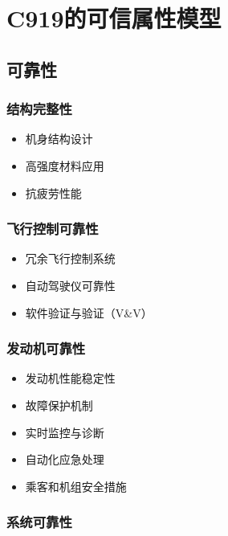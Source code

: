 \section{C919的可信属性模型}

\begin{multicols}{2}
  
  \subsection{可靠性}
  
  \subsubsection{结构完整性}
  
  \begin{itemize}
      \item 机身结构设计
      \item 高强度材料应用
      \item 抗疲劳性能
  \end{itemize}
  
  \subsubsection{飞行控制可靠性}
  
  \begin{itemize}
      \item 冗余飞行控制系统
      \item 自动驾驶仪可靠性
      \item 软件验证与验证（V\&V）
  \end{itemize}
  
  \subsubsection{发动机可靠性}
  
  \begin{itemize}
      \item 发动机性能稳定性
      \item 故障保护机制
      \item 实时监控与诊断
      \item 自动化应急处理
      \item 乘客和机组安全措施
  \end{itemize}

  \subsubsection{系统可靠性}
  

\end{multicols}
